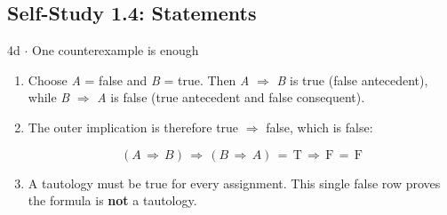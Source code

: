 \documentclass[11pt]{article}
\begin{document}
\begin{keepsection}\subsection{Self-Study 1.4: Statements}

\begin{workedbox}{4d \ensuremath{\cdot} One counterexample is enough}
\begin{enumerate}
\item Choose \textit{A} = false and \textit{B} = true. Then \textit{A} \ensuremath{\Rightarrow} \textit{B} is true (false antecedent), while \textit{B} \ensuremath{\Rightarrow} \textit{A} is false (true antecedent and false consequent).
\item {}
The outer implication is therefore true \ensuremath{\Rightarrow} false, which is false:

\begin{equation*}({A}\, \Rightarrow \, {B})\, \Rightarrow \, ({B}\, \Rightarrow \, {A})\, =\, \mathrm{T}\, \Rightarrow \, \mathrm{F}\, =\, \mathrm{F}\end{equation*}
\item A tautology must be true for every assignment. This single false row proves the formula is \textbf{not} a tautology.
\end{enumerate}
\end{workedbox}

\end{keepsection}
\end{document}
